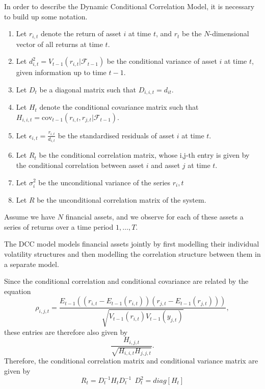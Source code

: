 \documentclass{article} %
\numberwithin{equation}{section} %
\numberwithin{figure}{section} %
\numberwithin{table}{section} %
\begin{document}
In order to describe the Dynamic Conditional Correlation Model, it is necessary to build up some notation.
\begin{enumerate}
  \item Let $r_{i,t}$ denote the return of asset $i$ at time $t$, and $r_t$ be the $N$-dimensional vector of all returns at time $t$.
  \item Let $d_{i,t}^2 = V_{t-1}(r_{i,t} | \mathcal{F}_{t-1})$ be the conditional variance of asset $i$ at time $t$, given information up to time $t-1$.
  \item Let $D_t$ be a diagonal matrix such that $D_{i,i,t} = d_{it}$.
  \item Let $H_t$ denote the conditional covariance matrix such that $H_{i,i,t} = \text{cov}_{t-1}(r_{i,t}, r_{j,t} | \mathcal{F}_{t-1})$.
  \item Let $\epsilon_{i,t} = \frac{r_{i,t}}{d_{i,t}}$ be the standardised residuals of asset $i$ at time $t$.
  \item Let $R_t$ be the conditional correlation matrix, whose i,j-th entry is given by the conditional correlation between asset $i$ and asset $j$ at time $t$.
  \item Let $\sigma_i^2$ be the unconditional variance of the series $r_i,t$
  \item Let $R$ be the unconditional correlation matrix of the system.
\end{enumerate}


Assume we have $N$ financial assets, and we observe for each of these assets a series of returns over a time period $1, \ldots , T$.

The DCC model models financial assets jointly by first modelling their individual volatility structures and then modelling the correlation structure between them in a separate model.

Since the conditional correlation and conditional covariance are related by the equation
\begin{equation}
  \rho_{i,j,t} = \frac{E_{t-1}((r_{i,t} - E_{t-1}(r_{i,t}))(r_{j,t} - E_{t-1}(r_{j,t})))}
                      {\sqrt{V_{t-1}(r_{i,t})V_{t-1}(y_{j,t})}},
\end{equation}
these entries are therefore also given by
\begin{equation}
  \frac{H_{i,j,t}}{\sqrt{H_{i,i,t}H_{j,j,t}}}.
\end{equation}
Therefore, the conditional correlation matrix and conditional variance matrix are given by
\begin{equation}
  R_t = D_t^{-1} H_t D_t ^{-1} \ \  D_t ^2 = diag[H_t]
\end{equation}
\end{document}
